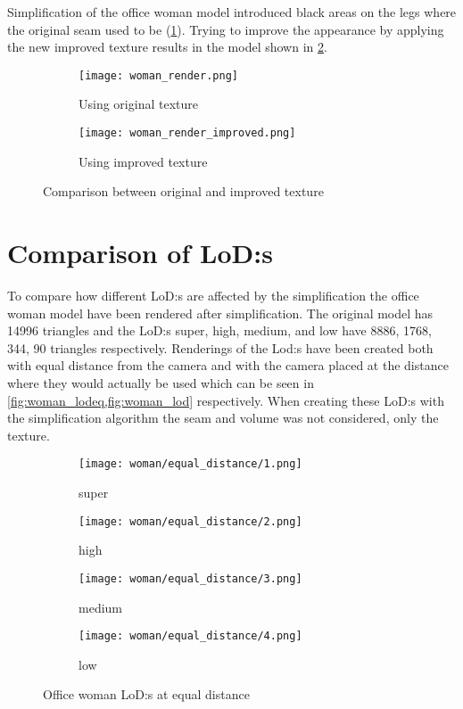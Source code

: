 Simplification of the office woman model introduced black areas on the legs where the original seam used to be (\cref{fig:using_original_texture}). Trying to improve the appearance by applying the new improved texture results in the model shown in \cref{fig:using_improved_texture}.

\begin{figure}[ht]
  \centering
  \begin{subfigure}[b]{.15\textwidth}
    \texttt{[image: woman\_render.png]}
    \caption{Using original texture}
    \label{fig:using_original_texture}
  \end{subfigure}
  \qquad
  \begin{subfigure}[b]{.15\textwidth}
    \texttt{[image: woman\_render\_improved.png]}
    \caption{Using improved texture}
    \label{fig:using_improved_texture}
  \end{subfigure}
  \caption{Comparison between original and improved texture}
  \label{fig:texture_comparison}
\end{figure}

\clearpage

\section{Comparison of LoD:s}

To compare how different LoD:s are affected by the simplification the office woman model have been rendered after simplification. The original model has 14996 triangles and the LoD:s super, high, medium, and low have 8886, 1768, 344, 90 triangles respectively. Renderings of the Lod:s have been created both with equal distance from the camera and with the camera placed at the distance where they would actually be used which can be seen in \cref{fig:woman_lodeq,fig:woman_lod} respectively. When creating these LoD:s with the simplification algorithm the seam and volume was not considered, only the texture.

\begin{figure}[ht]
  \centering
  \begin{subfigure}[b]{.22\textwidth}
    \texttt{[image: woman/equal\_distance/1.png]}
    \caption{super}
    \label{fig:womaneq0}
  \end{subfigure}
  \begin{subfigure}[b]{.22\textwidth}
    \texttt{[image: woman/equal\_distance/2.png]}
    \caption{high}
    \label{fig:womaneq1}
  \end{subfigure}
  \centering
  \begin{subfigure}[b]{.22\textwidth}
    \texttt{[image: woman/equal\_distance/3.png]}
    \caption{medium}
    \label{fig:womaneq2}
  \end{subfigure}
  \begin{subfigure}[b]{.22\textwidth}
    \texttt{[image: woman/equal\_distance/4.png]}
    \caption{low}
    \label{fig:womaneq3}
  \end{subfigure}
  \caption{Office woman LoD:s at equal distance}
  \label{fig:woman_lodeq}
\end{figure}

